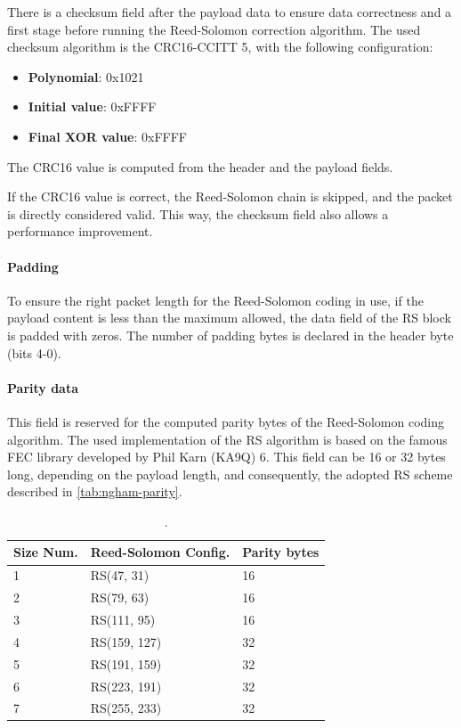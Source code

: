 There is a checksum field after the payload data to ensure data correctness and a first stage before running the Reed-Solomon correction algorithm. The used checksum algorithm is the CRC16-CCITT 5, with the following configuration:

\begin{itemize}
    \item \textbf{Polynomial}: 0x1021
    \item \textbf{Initial value}: 0xFFFF
    \item \textbf{Final XOR value}: 0xFFFF
\end{itemize}

The CRC16 value is computed from the header and the payload fields.

If the CRC16 value is correct, the Reed-Solomon chain is skipped, and the packet is directly considered valid. This way, the checksum field also allows a performance improvement.

\paragraph{Padding}

To ensure the right packet length for the Reed-Solomon coding in use, if the payload content is less than the maximum allowed, the data field of the RS block is padded with zeros. The number of padding bytes is declared in the header byte (bits 4-0).

\paragraph{Parity data}

This field is reserved for the computed parity bytes of the Reed-Solomon coding algorithm. The used implementation of the RS algorithm is based on the famous FEC library developed by Phil Karn (KA9Q) 6. This field can be 16 or 32 bytes long, depending on the payload length, and consequently, the adopted RS scheme described in \autoref{tab:ngham-parity}.

\begin{table}[!ht]
    \centering
    \begin{tabular}{lll}
        \toprule[1.5pt]
        \textbf{Size Num.} & \textbf{Reed-Solomon Config.} & \textbf{Parity bytes} \\
        \midrule
        1 & RS(47, 31)   & 16 \\
        2 & RS(79, 63)   & 16 \\
        3 & RS(111, 95)  & 16 \\
        4 & RS(159, 127) & 32 \\
        5 & RS(191, 159) & 32 \\
        6 & RS(223, 191) & 32 \\
        7 & RS(255, 233) & 32 \\
        \bottomrule[1.5pt]
    \end{tabular}
    \caption{.}
    \label{tab:ngham-parity}
\end{table}

